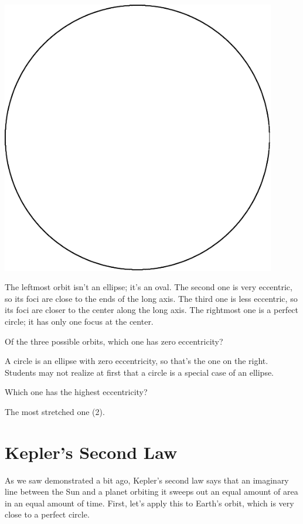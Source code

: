 \documentclass[12pt]{article}
\newcommand{\red}{\color{red}}
\begin{document}
\begin{minipage}{0.25\textwidth}
	\begin{center}
		\includegraphics[width=0.9\textwidth]{circle-crop.pdf}
	\end{center}
\end{minipage}

{\color{red} The leftmost orbit isn't an ellipse; it's an oval. The second one is very eccentric, so its foci are close to the ends of the long axis. The third one is less eccentric, so its foci are closer to the center along the long axis. The rightmost one is a perfect circle; it has only one focus at the center.}

Of the three possible orbits, which one has zero eccentricity? 

{\red A circle is an ellipse with zero eccentricity, so that's the one on the right. Students may not realize at first that a circle is a special case of an ellipse.}


Which one has the highest eccentricity?

{\red The most stretched one (2).}

\newpage


\section{Kepler's Second Law}

As we saw demonstrated a bit ago, Kepler's second law says that an imaginary line between the Sun and a planet orbiting it sweeps out an equal amount of area in an equal amount of time. First, let's apply this to Earth's orbit, which is very close to a perfect circle.
\end{document}
